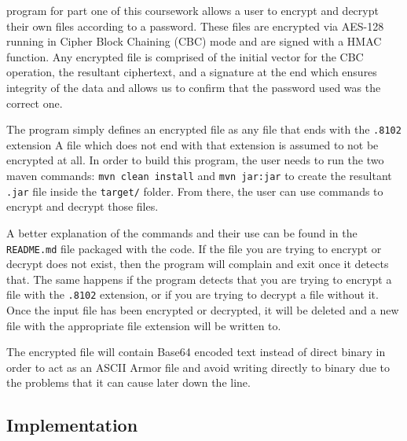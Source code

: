 \documentclass[10pt,journal,compsoc]{IEEEtran}
\begin{document}
% 
% 
% 
% 
 program for part one of this coursework allows a user to
encrypt and decrypt their own files according to a password. These files are
encrypted via AES-128 running in Cipher Block Chaining (CBC) mode and are
signed with a HMAC function. Any encrypted file is comprised of the initial
vector for the CBC operation, the resultant ciphertext, and a signature at the
end which ensures integrity of the data and allows us to confirm that the
password used was the correct one.

The program simply defines an encrypted file as any file that ends with the
\texttt{.8102} extension A file which does not end with that extension is
assumed to not be encrypted at all. In order to build this program, the user
needs to run the two maven commands: \texttt{mvn clean install} and
\texttt{mvn jar:jar} to create the resultant \texttt{.jar} file inside the
\texttt{target/} folder. From there, the user can use commands to encrypt and
decrypt those files.

A better explanation of the commands and their use can be found in the
\texttt{README.md} file packaged with the code. If the file you are trying to
encrypt or decrypt does not exist, then the program will complain and exit
once it detects that. The same happens if the program detects that you
are trying to encrypt a file with the \texttt{.8102} extension, or if you are
trying to decrypt a file without it. Once the input file has been encrypted or
decrypted, it will be deleted and a new file with the appropriate file
extension will be written to.

The encrypted file will contain Base64 encoded text instead of direct binary
in order to act as an ASCII Armor file and avoid writing directly to binary
due to the problems that it can cause later down the line.

\subsection{Implementation}
\end{document}
